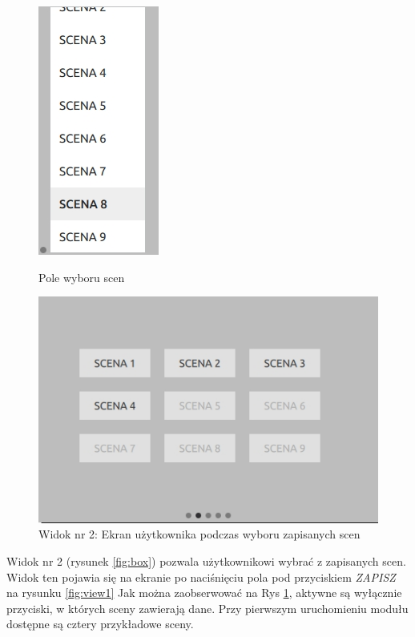 \documentclass[12pt, eng, twoside, openany, final]{mgr}
\begin{document}
            \begin{figure}[!h]
        	\centering
        	\begin{minipage}[t]{3cm}
        		\centering
        		\includegraphics[scale=0.4]{ui_box.jpg}
        		\caption{Pole wyboru scen} \label{fig:box} 
        	\end{minipage}
        	\hspace{3cm}
        	\begin{minipage}[t]{5cm}
        		\centering
        		\includegraphics[scale=0.4]{ui_sceneTAB.jpg}
        		\caption{Widok nr 2: Ekran użytkownika podczas wyboru zapisanych scen} \label{fig:scene} 
        	\end{minipage}
        \end{figure}
            
        \noindent Widok nr 2 (rysunek \ref{fig:box}) pozwala użytkownikowi wybrać z zapisanych scen. Widok ten pojawia się na ekranie po naciśnięciu pola pod przyciskiem \emph{ZAPISZ} na rysunku \ref{fig:view1} Jak można zaobserwować na Rys \ref{fig:scene}, aktywne są wyłącznie przyciski, w których sceny zawierają dane. Przy pierwszym uruchomieniu modułu dostępne są cztery przykładowe sceny.
        
\end{document}

